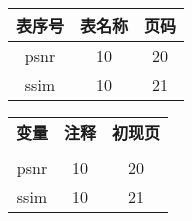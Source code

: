 \vspace{1em}
 {\wuhao
   \begin{raggedright}
    \begin{tabular}{|c| c| c|}
	     	\hline
	       \hspace{4em}表序号 \hspace{4em} & \hspace{7em}表名称 \hspace{7em} &\hspace{4em} 页码 \hspace{4em} \\
	      \hline
	       psnr  &  10     &  20   \\
	       \hline
	       ssim  &  10     &   21    \\
	       \hline   	
     \end{tabular}
 \end{raggedright} 
 }   

\newpage\thispagestyle{empty}
\begin{center}{\bfseries\xiaoer{}}\end{center}
\vspace{1em}
 {\wuhao
   \begin{raggedright}
    \begin{tabular}{ccc}
	       \hspace{4em}\textbf{变量} \hspace{4em} & \hspace{7em}\bfseries{注释} \hspace{7em} &\hspace{4em} \textbf{初现页} \hspace{4em} \\
	       \\
	       psnr  &  10     &  20   \\
	       ssim  &  10     &   21    \\  	
     \end{tabular}
 \end{raggedright} 
 }   
 \clearpage

